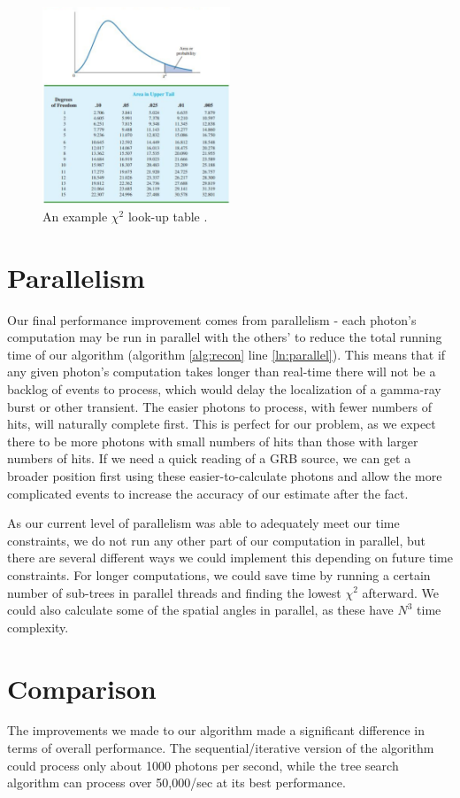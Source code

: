 \begin{figure}
    \centering
    \includegraphics[width=0.5\textwidth]{chi2table.png}
    \caption{An example $\chi^2$ look-up table \cite{chitable}.}
    \label{fig:p-val}
\end{figure}

\section{Parallelism}
Our final performance improvement comes from parallelism - each photon's computation may be run in parallel with the others' to reduce the total running time of our algorithm (algorithm \ref{alg:recon} line \ref{ln:parallel}). This means that if any given photon's computation takes longer than real-time there will not be a backlog of events to process, which would delay the localization of a gamma-ray burst or other transient. The easier photons to process, with fewer numbers of hits, will naturally complete first. This is perfect for our problem, as we expect there to be more photons with small numbers of hits than those with larger numbers of hits. If we need a quick reading of a GRB source, we can get a broader position first using these easier-to-calculate photons and allow the more complicated events to increase the accuracy of our estimate after the fact.

As our current level of parallelism was able to adequately meet our time constraints, we do not run any other part of our computation in parallel, but there are several different ways we could implement this depending on future time constraints. For longer computations, we could save time by running a certain number of sub-trees in parallel threads and finding the lowest $\chi^2$ afterward. We could also calculate some of the spatial angles in parallel, as these have $N^3$ time complexity.

\section{Comparison}

The improvements we made to our algorithm made a significant difference in terms of overall performance. The sequential/iterative version of the algorithm could process only about 1000 photons per second, while the tree search algorithm can process over 50,000/sec at its best performance.